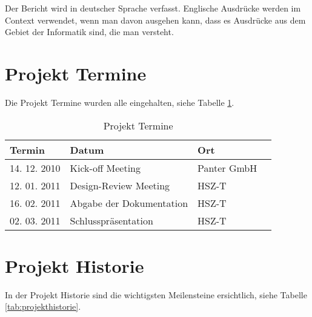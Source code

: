\documentclass[abstracton, listof=totocnumbered,
bibliography=totocnumbered]{scrreprt}
\begin{document}
  Der Bericht wird in deutscher Sprache verfasst. Englische Ausdrücke werden im
  Context verwendet, wenn man davon ausgehen kann, dass es Ausdrücke aus dem
  Gebiet der Informatik sind, die man versteht.
  
  \newpage
  
  \section{Projekt Termine}
  
  Die Projekt Termine wurden alle eingehalten, siehe Tabelle \ref{tab:termine}.
  \newline
  
  \begin{table}[h]
    \begin{center}
      \begin{tabular}{lp{7cm}ll}
        \toprule
        Termin & Datum & Ort \\
        \midrule
        14. 12. 2010 & Kick-off Meeting & Panter GmbH\\
        12. 01. 2011 & Design-Review Meeting & HSZ-T\\
        16. 02. 2011 & Abgabe der Dokumentation & HSZ-T\\
        02. 03. 2011 & Schlusspräsentation & HSZ-T\\
        \bottomrule
      \end{tabular}
      \caption{Projekt Termine}
      \label{tab:termine}
    \end{center}
  \end{table}
  
  \section{Projekt Historie}
  
  In der Projekt Historie sind die wichtigsten Meilensteine ersichtlich, siehe
  Tabelle \ref{tab:projekthistorie}.
  \newline
  
\end{document}
